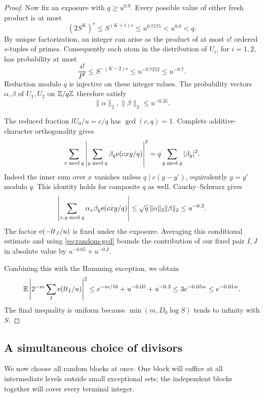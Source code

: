 \begin{proof}
Now fix an exposure with \(q\ge u^{0.9}\).  Every possible value of
either fresh product is at most
\[
 (2S^K)^s\le S^{(K+1)s}\le u^{0.7575}<u^{0.8}<q.
\]
By unique factorization, an integer can arise as the product of at most
\(s!\) ordered \(s\)-tuples of primes.  Consequently each atom in the
distribution of \(U_i\), for \(i=1,2\), has probability at most
\[
 \frac{s!}{P^s}\le S^{-(K-2)s}
      \le u^{-0.7252}\le u^{-0.7}.
\]
Reduction modulo \(q\) is injective on these integer values.  The
probability vectors \(\alpha,\beta\) of \(U_1,U_2\) on
\(\mathbb Z/q\mathbb Z\) therefore satisfy
\[
 \|\alpha\|_2,\|\beta\|_2\le u^{-0.35}.
\]

The reduced fraction \(lU_0/u=c/q\) has \(\gcd(c,q)=1\).
Complete additive-character orthogonality gives
\[
 \sum_{x\bmod q}\left|\sum_{y\bmod q}\beta_y\mathrm e(cxy/q)\right|^2
       =q\sum_{y\bmod q}|\beta_y|^2.
\]
Indeed the inner sum over \(x\) vanishes unless
\(q\mid c(y-y')\), equivalently \(y=y'\) modulo \(q\).
This identity holds for composite \(q\) as well.  Cauchy--Schwarz gives
\[
 \left|\sum_{x,y\bmod q}\alpha_x\beta_y\mathrm e(cxy/q)\right|
 \le \sqrt q\,\|\alpha\|_2\|\beta\|_2
 \le u^{-0.2}.
\]
The factor \(\mathrm e(-lt_J/u)\) is fixed under the exposure.  Averaging this
conditional estimate and using \eqref{eq:random-gcd} bounds the
contribution of our fixed pair \(I,J\) in absolute value by
\(u^{-0.05}+u^{-0.2}\).

Combining this with the Hamming exception, we obtain
\[
 \mathbb E\left|2^{-m}\sum_I\mathrm e(lt_I/u)\right|^2
 \le e^{-m/16}+u^{-0.05}+u^{-0.2}
 \le 3e^{-0.05w}
 \le e^{-0.01w}.
\]
The final inequality is uniform because
\(\min(m,D_0\log S)\) tends to infinity with \(S\).
\end{proof}

\subsection{A simultaneous choice of divisors}\label{subsec:selection}

We now choose all random blocks at once.  One block will suffice at all
intermediate levels outside small exceptional sets; the independent
blocks together will cover every terminal integer.

